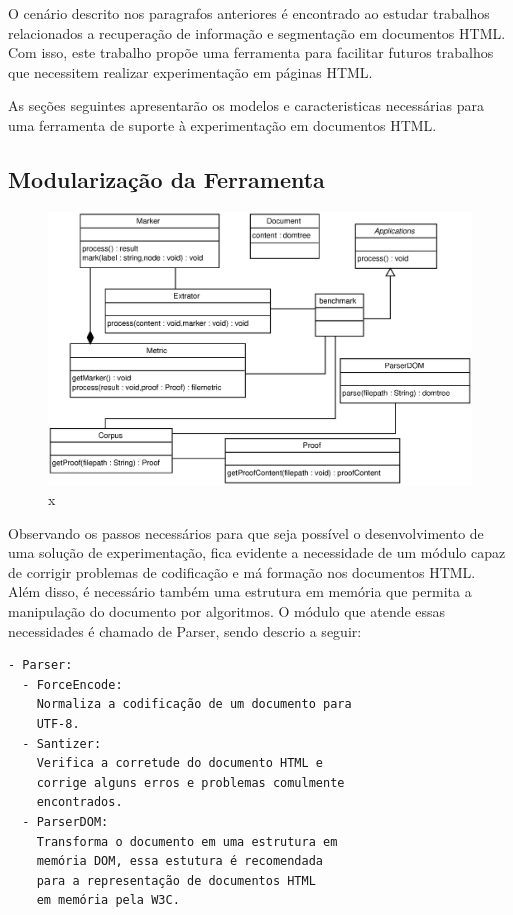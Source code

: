 \documentclass[12pt, a4paper]{article}
\begin{document}
O cenário descrito nos paragrafos anteriores é encontrado ao estudar trabalhos
relacionados a recuperação de informação e segmentação em documentos
HTML. Com isso, este trabalho propõe uma ferramenta para
facilitar futuros trabalhos que necessitem realizar experimentação em páginas
HTML.

As seções seguintes apresentarão os modelos e caracteristicas
necessárias para uma ferramenta de suporte à experimentação em
documentos HTML.

  \subsection{Modularização da Ferramenta}

\begin{figure}[htb]
  \begin{center}
  \includegraphics[width=12cm]{img/classes.eps}
  \caption{x}
  \label{x}
  \end{center}
\end{figure}


Observando os passos necessários para que seja possível o 
desenvolvimento de uma solução de experimentação, fica evidente a
necessidade de um módulo capaz de corrigir problemas de
codificação e má formação nos documentos HTML. Além
disso, é necessário também uma estrutura em memória que permita a
manipulação do documento por algoritmos.
O módulo que atende essas necessidades é chamado de Parser, sendo 
descrio a seguir:

\begin{verbatim}
- Parser: 
  - ForceEncode:
    Normaliza a codificação de um documento para
    UTF-8.
  - Santizer:
    Verifica a corretude do documento HTML e
    corrige alguns erros e problemas comulmente
    encontrados.
  - ParserDOM:
    Transforma o documento em uma estrutura em
    memória DOM, essa estutura é recomendada
    para a representação de documentos HTML
    em memória pela W3C.
\end{verbatim}
\end{document}
